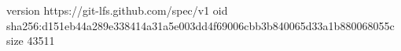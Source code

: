 version https://git-lfs.github.com/spec/v1
oid sha256:d151eb44a289e338414a31a5e003dd4f69006cbb3b840065d33a1b880068055c
size 43511
